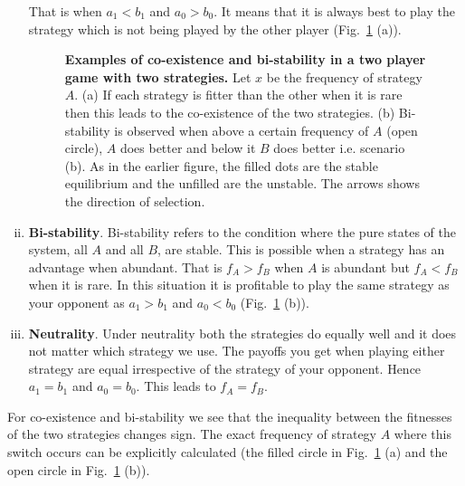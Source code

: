 \documentclass[oneside,11pt,a4paper]{book}
\begin{document}
\begin{enumerate}[(i)]
	That is when $a_1<b_1$ and $a_0>b_0$.
	It means that it is always best to play the strategy which is not being played by the other player (Fig.\ \ref{fig:codom} (a)).
\begin{figure}[!h]
  \begin{center}
  \end{center}
  \caption{
  \label{fig:codom}
  \textbf{Examples of co-existence and bi-stability in a two player game with two strategies.}
  \small{Let $x$ be the frequency of strategy $A$.
  (a) If each strategy is fitter than the other when it is rare then this leads to the co-existence of the two strategies.
(b) Bi-stability is observed when above a certain frequency of $A$ (open circle), $A$ does better and below it $B$ does better i.e. scenario (b).
As in the earlier figure, the filled dots are the stable equilibrium and the unfilled are the unstable.
The arrows shows the direction of selection.}
  }
\end{figure}
%
\item \textbf{Bi-stability}.
	Bi-stability refers to the condition where the pure states of the system, all $A$ and all $B$, are stable.
	This is possible when a strategy has an advantage when abundant.
	That is $f_A > f_B$ when $A$ is abundant but $f_A < f_B$ when it is rare.
	In this situation it is profitable to play the same strategy as your opponent as $a_1 > b_1$ and $a_0<b_0$ (Fig.\ \ref{fig:codom} (b)).
\item \textbf{Neutrality}.
	Under neutrality both the strategies do equally well and it does not matter which strategy we use.
	The payoffs you get when playing either strategy are equal irrespective of the strategy of your opponent.
	Hence $a_1 = b_1$ and $a_0 = b_0$.
	This leads to $f_A = f_B$.
\end{enumerate}
%
For co-existence and bi-stability we see that the inequality between the fitnesses of the two strategies changes sign.
The exact frequency of strategy $A$ where this switch occurs can be explicitly calculated (the filled circle in Fig.\ \ref{fig:codom} (a) and the open circle in Fig.\ \ref{fig:codom} (b)).
\end{document}
